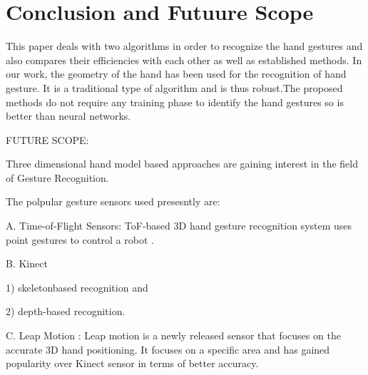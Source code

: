 \documentclass[conference]{IEEEtran}
\begin{document}
\section{Conclusion and Futuure Scope}
This paper deals with two algorithms in order to recognize the hand gestures and also compares their efficiencies with each other as well as established methods\cite{khan2012hand}. In our work, the geometry of the hand has been used for the recognition of hand gesture. It is a traditional type of algorithm and is thus robust.The proposed methods do not require any training phase\cite{7813732} to identify the hand gestures so is better than neural networks. 

FUTURE SCOPE:

Three dimensional hand model based approaches\cite{cheng2016survey} are gaining interest in the field of Gesture Recognition.



The polpular gesture sensors used presesntly are:

A. Time-of-Flight Sensors:
ToF-based 3D hand gesture recognition system uses point gestures to control a robot \cite{droeschel2011learning}.

B. Kinect

 1) skeletonbased recognition\cite{shotton2013real} and 
 
 2) depth-based recognition.

C. Leap Motion : Leap motion is a newly released sensor that focuses on the accurate 3D hand positioning. It focuses on a specific area and has gained popularity over Kinect sensor in terms of better accuracy\cite{regenbrecht2013leap}.





\end{document}
